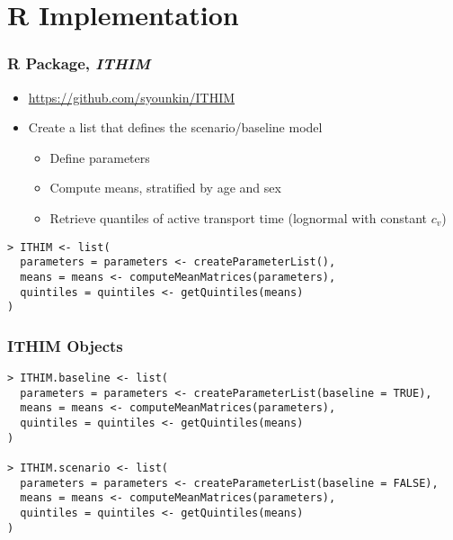 \documentclass[handout,13pt,compress,c]{beamer}
\newcommand{\bi}{\begin{itemize}}
\newcommand{\ei}{\end{itemize}}
\begin{document}
\section{R Implementation}
\begin{frame}[fragile]
\frametitle{R Package, \textit{ITHIM}}
\bi
\item \url{https://github.com/syounkin/ITHIM}
\item Create a list that defines the scenario/baseline model
\bi \item Define parameters \item Compute means, stratified by age and sex \item Retrieve quantiles of active transport time (lognormal with constant $c_v$)\ei
\ei
\begin{semiverbatim}
\begin{lstlisting}
> ITHIM <- list(
  parameters = parameters <- createParameterList(),
  means = means <- computeMeanMatrices(parameters),
  quintiles = quintiles <- getQuintiles(means)
)
\end{lstlisting}
\end{semiverbatim}
\end{frame}
\begin{frame}[fragile]
\frametitle{ITHIM Objects}
\begin{semiverbatim}
\begin{lstlisting}
> ITHIM.baseline <- list(
  parameters = parameters <- createParameterList(baseline = TRUE),
  means = means <- computeMeanMatrices(parameters),
  quintiles = quintiles <- getQuintiles(means)
)

> ITHIM.scenario <- list(
  parameters = parameters <- createParameterList(baseline = FALSE),
  means = means <- computeMeanMatrices(parameters),
  quintiles = quintiles <- getQuintiles(means)
)
\end{lstlisting}
\end{semiverbatim}
\end{frame}
\end{document}

